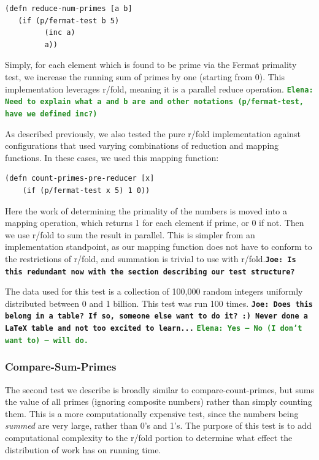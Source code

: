 \documentclass[12pt]{article}
\newcommand{\comment}[1]{{\bf \tt  {#1}}}
\newcommand{\emcomment}[1]{\textcolor{ForestGreen}{\comment{Elena: {#1}}}}
\newcommand{\joecomment}[1]{\textcolor{JoesGold}{\comment{Joe: {#1}}}}
\begin{document}
\begin{verbatim}
(defn reduce-num-primes [a b] 
   (if (p/fermat-test b 5)
         (inc a)
         a))
\end{verbatim}

Simply, for each element which is found to be prime via the Fermat primality test, we increase the running sum of primes by one (starting from 0). This implementation leverages r/fold, meaning it is a parallel reduce operation. 
\emcomment{Need to explain what a and b are and other notations (p/fermat-test, have we defined inc?) }

As described previously, we also tested the pure r/fold implementation against configurations that used varying combinations of reduction and mapping functions. In these cases, we used this mapping function:

\begin{verbatim}
(defn count-primes-pre-reducer [x] 
    (if (p/fermat-test x 5) 1 0))
\end{verbatim}

Here the work of determining the primality of the numbers is moved into a mapping operation, which returns 1 for each element if prime, or 0 if not. Then we use r/fold to sum the result in parallel. This is simpler from an implementation standpoint, as our mapping function does not have to conform to the restrictions of r/fold, and summation is trivial to use with r/fold.\joecomment{Is this redundant now with the section describing our test structure?}

The data used for this test is a collection of 100,000 random integers uniformly distributed between 0 and 1 billion. This test was run 100 times. \joecomment{Does this belong in a table? If so, someone else want to do it? :) Never done a LaTeX table and not too excited to learn...}
\emcomment{Yes -- No (I don't want to) -- will do.}

  
\subsubsection{Compare-Sum-Primes}\label{sec:sum-primes}
The second test we describe is broadly similar to compare-count-primes, but sums the value of all primes (ignoring composite numbers) rather than simply counting them. This is a more computationally expensive test, since the numbers being \emph{summed} are very large, rather than 0's and 1's. The purpose of this test is to add computational complexity to the r/fold portion to determine what effect the distribution of work has on running time.
\end{document}
